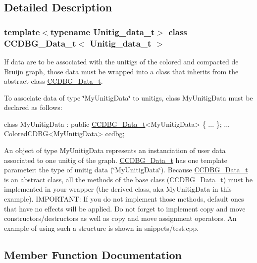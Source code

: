 \subsection{Detailed Description}
\subsubsection*{template$<$typename Unitig\+\_\+data\+\_\+t$>$\newline
class C\+C\+D\+B\+G\+\_\+\+Data\+\_\+t$<$ Unitig\+\_\+data\+\_\+t $>$}

If data are to be associated with the unitigs of the colored and compacted de Bruijn graph, those data must be wrapped into a class that inherits from the abstract class \hyperlink{classCCDBG__Data__t}{C\+C\+D\+B\+G\+\_\+\+Data\+\_\+t}. 

To associate data of type \char`\"{}\+My\+Unitig\+Data\char`\"{} to unitigs, class My\+Unitig\+Data must be declared as follows\+: 
\begin{DoxyCode}
\textcolor{keyword}{class }MyUnitigData : \textcolor{keyword}{public} \hyperlink{classCCDBG__Data__t}{CCDBG\_Data\_t}<MyUnitigData> \{ ... \};
...
ColoredCDBG<MyUnitigData> ccdbg;
\end{DoxyCode}
 An object of type My\+Unitig\+Data represents an instanciation of user data associated to one unitig of the graph. \hyperlink{classCCDBG__Data__t}{C\+C\+D\+B\+G\+\_\+\+Data\+\_\+t} has one template parameter\+: the type of unitig data (\char`\"{}\+My\+Unitig\+Data\char`\"{}). Because \hyperlink{classCCDBG__Data__t}{C\+C\+D\+B\+G\+\_\+\+Data\+\_\+t} is an abstract class, all the methods of the base class (\hyperlink{classCCDBG__Data__t}{C\+C\+D\+B\+G\+\_\+\+Data\+\_\+t}) must be implemented in your wrapper (the derived class, aka My\+Unitig\+Data in this example). I\+M\+P\+O\+R\+T\+A\+NT\+: If you do not implement those methods, default ones that have no effects will be applied. Do not forget to implement copy and move constructors/destructors as well as copy and move assignment operators. An example of using such a structure is shown in snippets/test.\+cpp. 

\subsection{Member Function Documentation}
\mbox{\label{classCCDBG__Data__t_adcdd42b81067d6095534f53b09c24aac}} 
